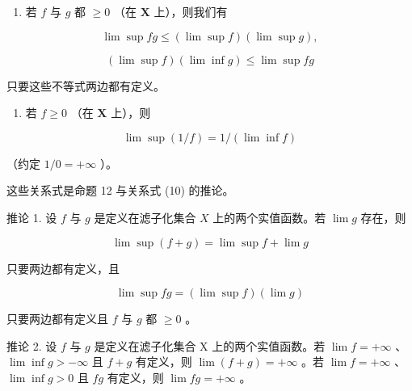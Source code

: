 \begin{enumerate}
\def\labelenumi{(\roman{enumi})}
\setcounter{enumi}{1}
\tightlist
\item
  若 \(f\) 与 \(g\) 都 \(\geqslant 0\) （在 \(\mathbf{X}\) 上），则我们有
\end{enumerate}

\[
\lim \sup f g \leqslant (\lim \sup f) (\lim \sup g), \tag {30}
\]

\[
(\lim \sup f) (\lim \inf g) \leqslant \lim \sup f g \tag {31}
\]

只要这些不等式两边都有定义。

\begin{enumerate}
\def\labelenumi{(\roman{enumi})}
\setcounter{enumi}{2}
\tightlist
\item
  若 \(f \geqslant 0\) （在 \(\mathbf{X}\) 上），则
\end{enumerate}

\[
\lim \sup (1 / f) = 1 / (\lim \inf f)\tag{32}
\]

（约定 \(1 / 0 = +\infty\) ）。

这些关系式是命题 12 与关系式 (10) 的推论。

推论 1. 设 \(f\) 与 \(g\) 是定义在滤子化集合 \(X\) 上的两个实值函数。若 \(\lim g\) 存在，则

\[
\lim \sup (f + g) = \lim \sup f + \lim g \tag {33}
\]

只要两边都有定义，且

\[
\lim \sup f g = (\lim \sup f) (\lim g) \tag {34}
\]

只要两边都有定义且 \(f\) 与 \(g\) 都 \(\geqslant 0\) 。

推论 2. 设 \(f\) 与 \(g\) 是定义在滤子化集合 X 上的两个实值函数。若 \(\lim f = +\infty\) 、\(\lim \inf g > -\infty\) 且 \(f + g\) 有定义，则 \(\lim (f + g) = +\infty\) 。若 \(\lim f = +\infty\) 、\(\lim \inf g > 0\) 且 \(fg\) 有定义，则 \(\lim fg = +\infty\) 。

